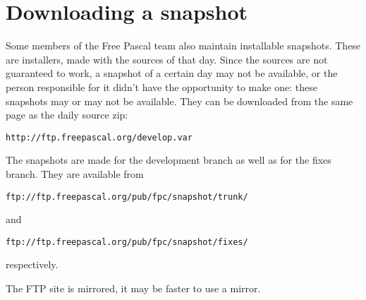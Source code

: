 \section{Downloading a snapshot}
Some members of the Free Pascal team also maintain installable snapshots.
These are installers, made with the sources of that day. Since the sources
are not guaranteed to work, a snapshot of a certain day may not be
available, or the person responsible for it didn't have the opportunity to
make one: these snapshots may or may not be available. They can be
downloaded from the same page as the daily source zip:
\begin{verbatim}
http://ftp.freepascal.org/develop.var
\end{verbatim}
The snapshots are made for the development branch as well as for the fixes
branch. They are available from
\begin{verbatim}
ftp://ftp.freepascal.org/pub/fpc/snapshot/trunk/
\end{verbatim}
and
\begin{verbatim}
ftp://ftp.freepascal.org/pub/fpc/snapshot/fixes/
\end{verbatim}
respectively.

The FTP site is mirrored, it may be faster to use a mirror.


